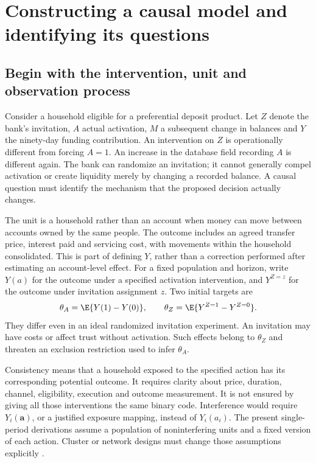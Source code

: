 \chapter{Constructing a causal model and identifying its questions}
\label{r3:graphs}
\section{Begin with the intervention, unit and observation process}
Consider a household eligible for a preferential deposit product. Let $Z$
denote the bank's invitation, $A$ actual activation, $M$ a subsequent change
in balances and $Y$ the ninety-day funding contribution. An intervention on
$Z$ is operationally different from forcing $A=1$. An increase in the
database field recording $A$ is different again. The bank can randomize an
invitation; it cannot generally compel activation or create liquidity merely
by changing a recorded balance. A causal question must identify the mechanism
that the proposed decision actually changes.

The unit is a household rather than an account when money can move between
accounts owned by the same people. The outcome includes an agreed transfer
price, interest paid and servicing cost, with movements within the household
consolidated. This is part of defining $Y$, rather than a correction performed
after estimating an account-level effect. For a fixed population and horizon,
write $Y(a)$ for the outcome under a specified activation intervention, and
$Y^{Z=z}$ for the outcome under invitation assignment $z$. Two initial targets
are
\begin{equation}
 \theta_A=\E\{Y(1)-Y(0)\},\qquad
 \theta_Z=\E\{Y^{Z=1}-Y^{Z=0}\}.
 \label{r3:targets}
\end{equation}
They differ even in an ideal randomized invitation experiment. An invitation
may have costs or affect trust without activation. Such effects belong to
$\theta_Z$ and threaten an exclusion restriction used to infer $\theta_A$.

Consistency means that a household exposed to the specified action has its
corresponding potential outcome. It requires clarity about price, duration,
channel, eligibility, execution and outcome measurement. It is not ensured
by giving all those interventions the same binary code. Interference would
require $Y_i(\mathbf a)$, or a justified exposure mapping, instead of $Y_i(a_i)$.
The present single-period derivations assume a population of noninterfering
units and a fixed version of each action. Cluster or network designs must
change those assumptions explicitly \citep[Chapters 1--3]{hernan2020}.

